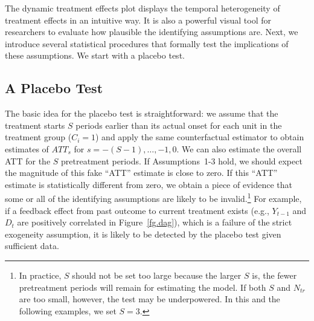\documentclass[12pt]{article}
\begin{document}
The dynamic treatment effects plot displays the temporal heterogeneity of treatment effects in an intuitive way. It is also a powerful visual tool for researchers to evaluate how plausible the identifying assumptions are. Next, we introduce several statistical procedures that formally test the implications of these assumptions. We start with a placebo test.

\subsection{A Placebo Test}

The basic idea for the placebo test is straightforward: we assume that the treatment starts $S$ periods earlier than its actual onset for each unit in the treatment group ($C_i = 1$) and apply the same counterfactual estimator to obtain estimates of $ATT_s$ for $s = -(S-1), \hdots, -1, 0$. We can also estimate the overall ATT for the $S$ pretreatment periods. If Assumptions~1-3 hold, we should expect the magnitude of this fake ``ATT'' estimate is close to zero. If this ``ATT'' estimate is statistically different from zero, we obtain a piece of evidence that some or all of the identifying assumptions are likely to be invalid.\footnote{In practice, $S$ should not be set too large because the larger $S$ is, the fewer pretreatment periods will remain for estimating the model. If both $S$ and $N_{tr}$ are too small, however, the test may be underpowered. In this and the following examples, we set $S = 3$.} For example, if a feedback effect from past outcome to current treatment exists (e.g., $Y_{t-1}$ and $D_{t}$ are positively correlated in Figure~\ref{fg.dag}), which is a failure of the strict exogeneity assumption, it is likely to be detected by the placebo test given sufficient data. 
\end{document}
